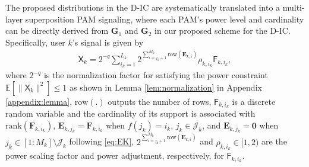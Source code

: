 \documentclass[12pt, draftclsnofoot, onecolumn]{IEEEtran}
\newcommand{\msf}[1]{\mathsf{#1}}
\theoremstyle{definition}
\begin{document}
The proposed distributions in the D-IC are systematically translated into a multi-layer superposition PAM signaling, where each PAM's power level and cardinality can be directly derived from $\boldsymbol{G}_1$ and $\boldsymbol{G}_2$ in our proposed scheme for the D-IC. Specifically, user $k$'s signal is given by
\begin{align}\label{eq:X1}
\msf{X}_k = 2^{-q}\sum_{i_k=1}^{L_k}2^{\sum_{i=j_k+1}^{M_k}\text{row}(\boldsymbol{E}_{k,i})}\rho_{k,i_k}\msf{F}_{k,i_k},
\end{align}
where $2^{-q}$ is the normalization factor for satisfying the power constraint $\mathbb{E}[\|\msf{X}_k\|^2] \leq 1$ as shown in Lemma \ref{lem:normalization} in Appendix \ref{appendix:lemma}, $\text{row}(.)$ outputs the number of rows, $\msf{F}_{k,i_k}$ is a discrete random variable and the cardinality of its support is associated with $\text{rank}(\boldsymbol{F}_{k,i_k})$, $\boldsymbol{E}_{k,j_k} = \boldsymbol{F}_{k,i_k}$ when $f(j_k) = i_k$, $j_k \in \mathcal{J}_k$, and $\boldsymbol{E}_{k,j_k} = \boldsymbol{0}$ when $j_k \in [1:M_k] \setminus \mathcal{J}_k$ following \eqref{eq:EK}, $2^{\sum_{i=j_k+1}^{M_k}\text{row}(\boldsymbol{E}_{k,i})}$ and $\rho_{k,i_k} \in [1,2)$ are the power scaling factor and power adjustment, respectively, for $\msf{F}_{k,i_k}$.
\end{document}
